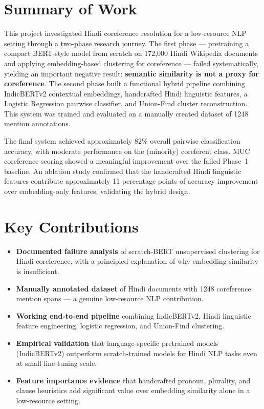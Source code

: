 \documentclass[12pt,a4paper]{report}
\begin{document}
\section{Summary of Work}

This project investigated Hindi coreference resolution for a low-resource NLP setting through a two-phase research journey. The first phase --- pretraining a compact BERT-style model from scratch on 172,000 Hindi Wikipedia documents and applying embedding-based clustering for coreference --- failed systematically, yielding an important negative result: \textbf{semantic similarity is not a proxy for coreference}. The second phase built a functional hybrid pipeline combining IndicBERTv2 contextual embeddings, handcrafted Hindi linguistic features, a Logistic Regression pairwise classifier, and Union-Find cluster reconstruction. This system was trained and evaluated on a manually created dataset of 1248 mention annotations.

The final system achieved approximately 82\% overall pairwise classification accuracy, with moderate performance on the (minority) coreferent class. MUC coreference scoring showed a meaningful improvement over the failed Phase~1 baseline. An ablation study confirmed that the handcrafted Hindi linguistic features contribute approximately 11 percentage points of accuracy improvement over embedding-only features, validating the hybrid design.

\section{Key Contributions}

\begin{itemize}
    \item \textbf{Documented failure analysis} of scratch-BERT unsupervised clustering for Hindi coreference, with a principled explanation of why embedding similarity is insufficient.
    \item \textbf{Manually annotated dataset} of Hindi documents with 1248 coreference mention spans --- a genuine low-resource NLP contribution.
    \item \textbf{Working end-to-end pipeline} combining IndicBERTv2, Hindi linguistic feature engineering, logistic regression, and Union-Find clustering.
    \item \textbf{Empirical validation} that language-specific pretrained models (IndicBERTv2) outperform scratch-trained models for Hindi NLP tasks even at small fine-tuning scale.
    \item \textbf{Feature importance evidence} that handcrafted pronoun, plurality, and clause heuristics add significant value over embedding similarity alone in a low-resource setting.
\end{itemize}
\end{document}
